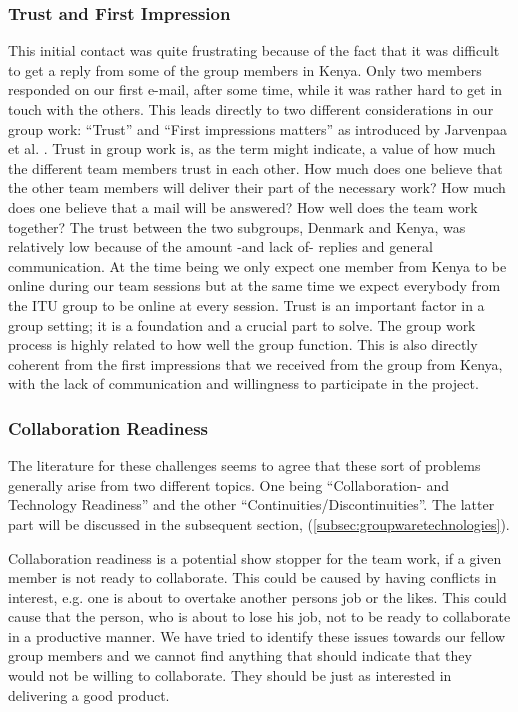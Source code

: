 \subsubsection{Trust and First Impression} \label{subsubsec:trustandfirstimpressions}
This initial contact was quite frustrating because of the fact that it was difficult to get a reply from some of the group members in Kenya. Only two members responded on our first e-mail, after some time, while it was rather hard to get in touch with the others. This leads directly to two different considerations in our group work: ``Trust'' and ``First impressions matters'' as introduced by Jarvenpaa et al. \cite{jarvenpaa1998communication}. Trust in group work is, as the term might indicate, a value of how much the different team members trust in each other. How much does one believe that the other team members will deliver their part of the necessary work? How much does one believe that a mail will be answered? How well does the team work together? The trust between the two subgroups, Denmark and Kenya, was relatively low because of the amount -and lack of- replies and general communication. At the time being we only expect one member from Kenya to be online during our team sessions but at the same time we expect everybody from the ITU group to be online at every session. Trust is an important factor in a group setting; it is a foundation and a crucial part to solve. The group work process is highly related to how well the group function. This is also directly coherent from the first impressions that we received from the group from Kenya, with the lack of communication and willingness to participate in the project. 

\subsubsection{Collaboration Readiness} \label{subsubsec:collaborationreadiness}
The literature for these challenges seems to agree that these sort of problems generally arise from two different topics. One being ``Collaboration- and Technology Readiness'' and the other ``Continuities/Discontinuities''. The latter part will be discussed in the subsequent section,  (\ref{subsec:groupwaretechnologies}).

Collaboration readiness is a potential show stopper for the team work, if a given member is not ready to collaborate. This could be caused by having conflicts in interest, e.g. one is about to overtake another persons job or the likes. This could cause that the person, who is about to lose his job, not to be ready to collaborate in a productive manner. We have tried to identify these issues towards our fellow group members and we cannot find anything that should indicate that they would not be willing to collaborate. They should be just as interested in delivering a good product. 

